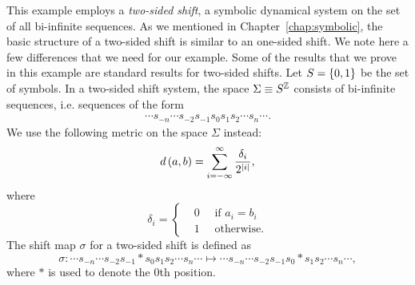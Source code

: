 \documentclass[10pt,twoside,draft]{book}
\begin{document}
\begin{example}
  \citep{blanchard}
  This example employs a \textit{two-sided shift}, a symbolic dynamical system on the set of all bi-infinite sequences.
  As we mentioned in Chapter~\ref{chap:symbolic}, the basic structure of a two-sided shift is similar to an one-sided shift.
  We note here a few differences that we need for our example.
  Some of the results that we prove in this example are standard results for two-sided shifts.
  Let $S = \left \{ 0,1 \right \}$ be the set of symbols.
  In a two-sided shift system, the space $\Sigma \equiv S^{\mathbb{Z}}$ consists of bi-infinite sequences, i.e. sequences of the form
  \begin{align*}
    \cdots s_{-n} \cdots s_{-2} s_{-1} s_0 s_1 s_2 \cdots s_n \cdots.
  \end{align*}
  We use the following metric on the space $\Sigma$ instead:
  \begin{equation*}
    d\left( a,b \right) = \sum\limits_{i = -\infty}^{\infty} \frac{\delta_i}{2^{\left | i \right |}},
  \end{equation*}
  where
  \begin{equation*}
    \delta_i = 
    \begin{cases}
      &0 \quad \mbox{ if } a_i = b_i  \\
      &1 \quad \mbox{ otherwise.}
    \end{cases}
  \end{equation*}
  The shift map $\sigma$ for a two-sided shift is defined as
  \begin{equation*}
    \sigma: 
    \cdots s_{-n} \cdots s_{-2} s_{-1} * s_0 s_1 s_2 \cdots s_n \cdots
    \mapsto
    \cdots s_{-n} \cdots s_{-2} s_{-1} s_0 * s_1 s_2 \cdots s_n \cdots,
  \end{equation*}
  where $*$ is used to denote the 0th position.


\end{example}
\end{document}
